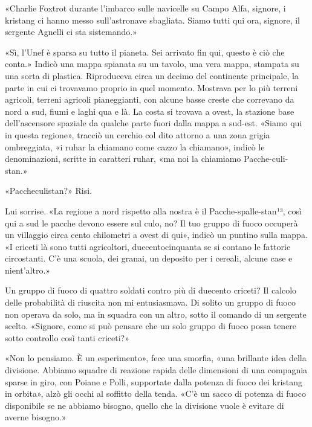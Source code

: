 «Charlie Foxtrot durante l'imbarco sulle navicelle su Campo Alfa,
signore, i kristang ci hanno messo sull'astronave sbagliata. Siamo tutti
qui ora, signore, il sergente Agnelli ci sta sistemando.»

«Sì, l'Unef è sparsa su tutto il pianeta. Sei arrivato fin qui, questo è
ciò che conta.» Indicò una mappa spianata su un tavolo, una vera mappa,
stampata su una sorta di plastica. Riproduceva circa un decimo del
continente principale, la parte in cui ci trovavamo proprio in quel
momento. Mostrava per lo più terreni agricoli, terreni agricoli
pianeggianti, con alcune basse creste che correvano da nord a sud, fiumi
e laghi qua e là. La costa si trovava a ovest, la stazione base
dell'ascensore spaziale da qualche parte fuori dalla mappa a sud-est.
«Siamo qui in questa regione», tracciò un cerchio col dito attorno a una
zona grigia ombreggiata, «i ruhar la chiamano come cazzo la chiamano»,
indicò le denominazioni, scritte in caratteri ruhar, «ma noi la
chiamiamo Pacche-culi-stan.»

«Paccheculistan?» Risi.

Lui sorrise. «La regione a nord rispetto alla nostra è il
Pacche-spalle-stan¹³, così qui a sud le pacche devono essere sul culo,
no? Il tuo gruppo di fuoco occuperà un villaggio circa cento chilometri
a ovest di qui», indicò un puntino sulla mappa. «I criceti là sono tutti
agricoltori, duecentocinquanta se si contano le fattorie circostanti.
C'è una scuola, dei granai, un deposito per i cereali, alcune case e
nient'altro.»

Un gruppo di fuoco di quattro soldati contro più di duecento criceti? Il
calcolo delle probabilità di riuscita non mi entusiasmava. Di solito un
gruppo di fuoco non operava da solo, ma in squadra con un altro, sotto
il comando di un sergente scelto. «Signore, come si può pensare che un
solo gruppo di fuoco possa tenere sotto controllo così tanti criceti?»

«Non lo pensiamo. È un esperimento», fece una smorfia, «una brillante
idea della divisione. Abbiamo squadre di reazione rapida delle
dimensioni di una compagnia sparse in giro, con Poiane e Polli,
supportate dalla potenza di fuoco dei kristang in orbita», alzò gli
occhi al soffitto della tenda. «C'è un sacco di potenza di fuoco
disponibile se ne abbiamo bisogno, quello che la divisione vuole è
evitare di averne bisogno.»

